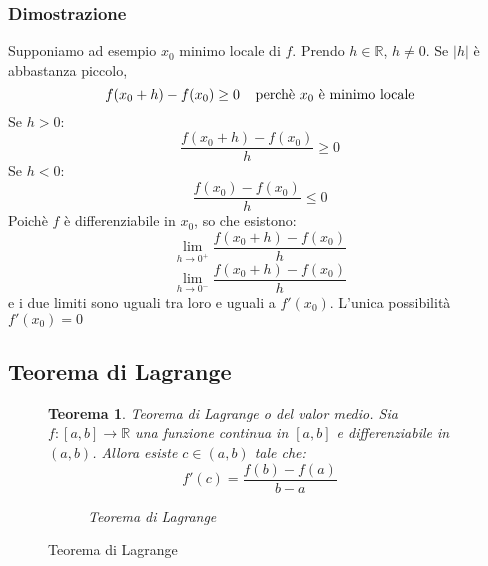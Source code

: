 \documentclass[a4paper]{article}
\newtheorem{theorem}{Teorema}
\theoremstyle{break}
\theoremstyle{break}
\theoremstyle{break}
\theoremstyle{break}
\begin{document}
\subsubsection{Dimostrazione}
Supponiamo ad esempio \( x_0 \) minimo locale di \( f \). Prendo \( h \in \mathbb{R} \),
\( h \neq 0 \). Se \( |h| \) è abbastanza piccolo,
\[
  f(x_0+h)-f(x_0) \ge 0\;\;\;\;\text{perchè \( x_0 \) è minimo locale}
\] 
Se \( h > 0 \):
\[
  \frac{f(x_0+h) - f(x_0)}{h} \ge 0
\] 
Se \( h < 0 \):
\[
  \frac{f(x_0)-f(x_0)}{h} \le 0
\] 
Poichè \( f \) è differenziabile in \( x_0 \), so che esistono:
\[
  \lim_{h \to 0^+} \frac{f(x_0 + h) - f(x_0)}{h} 
\] 
\[
  \lim_{h \to 0^-} \frac{f(x_0 + h) - f(x_0)}{h} 
\] 
e i due limiti sono uguali tra loro e uguali a \( f'(x_0) \). L'unica possibilità \( f'(x_0)=0 \) 

\subsection{Teorema di Lagrange}
\begin{figure}[H]
  \begin{theorem}
    Teorema di Lagrange o del valor medio. Sia \( f: [a,b]  \to \mathbb{R}\) una funzione
    continua in \( [a,b] \) e differenziabile in \( (a,b) \). Allora esiste 
    \( c \in (a,b) \) tale che:
    \[
      f'(c) = \frac{f(b)-f(a)}{b-a}
    \]
    \begin{figure}[H]
      \begin{center}
      \end{center}
      \caption{Teorema di Lagrange}
    \end{figure}

  \end{theorem}
\end{figure}
\end{document}
